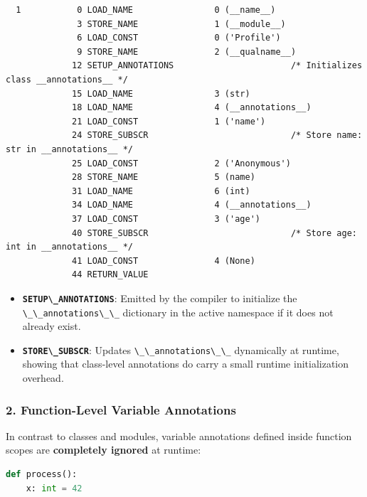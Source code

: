 \begin{lstlisting}
  1           0 LOAD_NAME                0 (__name__)
              3 STORE_NAME               1 (__module__)
              6 LOAD_CONST               0 ('Profile')
              9 STORE_NAME               2 (__qualname__)
             12 SETUP_ANNOTATIONS                       /* Initializes class __annotations__ */
             15 LOAD_NAME                3 (str)
             18 LOAD_NAME                4 (__annotations__)
             21 LOAD_CONST               1 ('name')
             24 STORE_SUBSCR                            /* Store name: str in __annotations__ */
             25 LOAD_CONST               2 ('Anonymous')
             28 STORE_NAME               5 (name)
             31 LOAD_NAME                6 (int)
             34 LOAD_NAME                4 (__annotations__)
             37 LOAD_CONST               3 ('age')
             40 STORE_SUBSCR                            /* Store age: int in __annotations__ */
             41 LOAD_CONST               4 (None)
             44 RETURN_VALUE
\end{lstlisting}

\begin{itemize}
\tightlist
\item
  \textbf{\passthrough{\lstinline!SETUP\_ANNOTATIONS!}}: Emitted by the
  compiler to initialize the
  \passthrough{\lstinline!\_\_annotations\_\_!} dictionary in the active
  namespace if it does not already exist.
\item
  \textbf{\passthrough{\lstinline!STORE\_SUBSCR!}}: Updates
  \passthrough{\lstinline!\_\_annotations\_\_!} dynamically at runtime,
  showing that class-level annotations do carry a small runtime
  initialization overhead.
\end{itemize}

\hypertarget{function-level-variable-annotations}{%
\subsubsection{2. Function-Level Variable
Annotations}\label{function-level-variable-annotations}}

In contrast to classes and modules, variable annotations defined inside
function scopes are \textbf{completely ignored} at runtime:

\begin{lstlisting}[language=Python]
def process():
    x: int = 42
\end{lstlisting}

